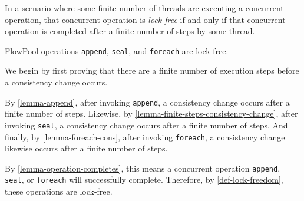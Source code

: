 



\begin{definitiontwo}\label{def-lock-freedom}
In a scenario where some finite number of threads are executing a concurrent
operation, that concurrent operation is \textit{lock-free} if and only if that
concurrent operation is completed after a finite number of steps by some
thread.
\end{definitiontwo}


\begin{theoremtwo}\label{theorem-lock-freedom}
FlowPool operations \verb=append=, \verb=seal=, and \verb=foreach= are lock-free.

We begin by first proving that there are a finite number of execution steps
before a consistency change occurs.

By \ref{lemma-append}, after invoking \verb=append=, a consistency
change occurs after a finite number of steps. Likewise, by
\ref{lemma-finite-steps-consistency-change}, after invoking \verb=seal=, a consistency
change occurs after a finite number of steps. And finally, by
\ref{lemma-foreach-cons},
after invoking \verb=foreach=, a consistency change likewise
occurs after a finite number of steps.

By \ref{lemma-operation-completes}, this means a concurrent operation
\verb=append=, \verb=seal=, or \verb=foreach= will successfully complete.
Therefore, by \ref{def-lock-freedom},  these operations are lock-free.

\end{theoremtwo}

